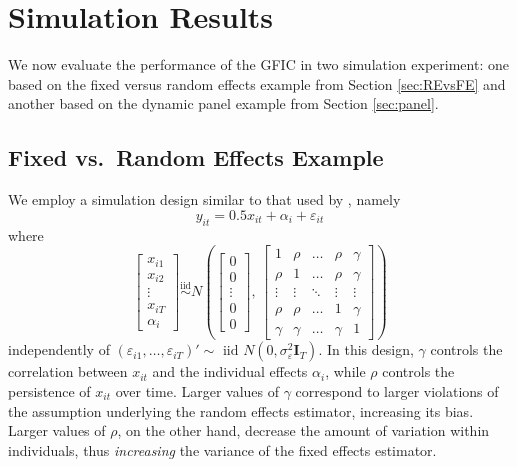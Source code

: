 \section{Simulation Results}
\label{sec:simulation}
We now evaluate the performance of the GFIC in two simulation experiment: one based on the fixed versus random effects example from Section \ref{sec:REvsFE} and another based on the dynamic panel example from Section \ref{sec:panel}. 

\subsection{Fixed vs.\ Random Effects Example}
We employ a simulation design similar to that used by \cite{GuggenbergerRE}, namely
\begin{equation*}
  y_{it} = 0.5 x_{it} + \alpha_i + \varepsilon_{it}
\end{equation*}
where
\[
  \begin{bmatrix}
x_{i1}\\
x_{i2}\\
\vdots\\
x_{iT}\\
\alpha_i
\end{bmatrix}  \overset{\mbox{iid}}{\sim} N \left (
\begin{bmatrix}
0\\
0\\
\vdots\\
0\\
0
\end{bmatrix} , \, 
\begin{bmatrix}
1 & \rho & \ldots & \rho & \gamma\\
\rho & 1 & \ldots & \rho & \gamma\\
\vdots & \vdots&  \ddots & \vdots &\vdots\\
\rho & \rho & \ldots & 1 & \gamma\\
\gamma& \gamma &\ldots& \gamma & 1 
\end{bmatrix}
\right)
\]
independently of $\left( \varepsilon_{i1}, \dots, \varepsilon_{iT} \right)' \sim \mbox{ iid } N(0, \sigma_{\varepsilon}^2 \mathbf{I}_T)$.
In this design, $\gamma$ controls the correlation between $x_{it}$ and the individual effects $\alpha_i$, while $\rho$ controls the persistence of $x_{it}$ over time.
Larger values of $\gamma$ correspond to larger violations of the assumption underlying the random effects estimator, increasing its bias.
Larger values of $\rho$, on the other hand, decrease the amount of variation within individuals, thus \emph{increasing} the variance of the fixed effects estimator. 
